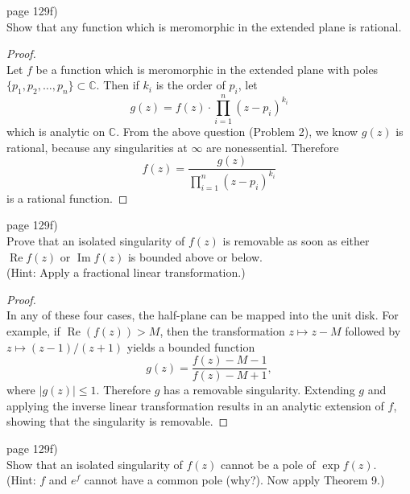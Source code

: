 \documentclass{article}
\newenvironment{problem}[2][Problem]{\begin{trivlist}
\item[\hskip \labelsep {\bfseries #1}\hskip \labelsep {\bfseries #2.}]}{\end{trivlist}}
\begin{document}
\begin{problem}{4} (page 129f) \\
  Show that any function which is meromorphic in the extended plane is rational.
\end{problem}

\begin{proof} \text{} \\
  Let $f$ be a function which is meromorphic in the extended plane with poles
    $\{ p_1, p_2, \hdots, p_n \} \subset \mathbb{C}$.
  Then if $k_i$ is the order of $p_i$, let \[
    g(z) = f(z) \cdot \prod_{i=1}^{n} (z - p_i)^{k_i}
  \] which is analytic on $\mathbb{C}$. From the above question (Problem 2), we
  know $g(z)$ is rational, because any singularities at $\infty$ are
  nonessential. Therefore \[
    f(z) = \frac{g(z)}{\prod_{i=1}^{n} (z - p_i)^{k_i}}
  \] is a rational function.
\end{proof}
\pagebreak

\begin{problem}{5} (page 129f) \\
  Prove that an isolated singularity of $f(z)$ is removable as soon as either
  $\operatorname{Re} f(z)$ or $\operatorname{Im} f(z)$ is bounded above or
  below.\\
  (Hint: Apply a fractional linear transformation.)
\end{problem}

\begin{proof} \text{} \\
  In any of these four cases, the half-plane can be mapped into the unit disk.
  For example, if $\operatorname{Re}(f(z)) > M$, then the transformation
  $z \mapsto z - M$ followed by $z \mapsto (z-1)/(z+1)$ yields a bounded
  function \[
    g(z) = \frac{f(z) - M - 1}{f(z) - M + 1},
  \] where $|g(z)| \leq 1$. Therefore $g$ has a removable singularity.
  Extending $g$ and applying the inverse linear transformation results in an
  analytic extension of $f$, showing that the singularity is removable.
\end{proof}
\pagebreak

\begin{problem}{6} (page 129f) \\
  Show that an isolated singularity of $f(z)$ cannot be a pole of $\exp f(z)$.\\
  (Hint: $f$ and $e^f$ cannot have a common pole (why?). Now apply Theorem 9.)
\end{problem}
\end{document}
